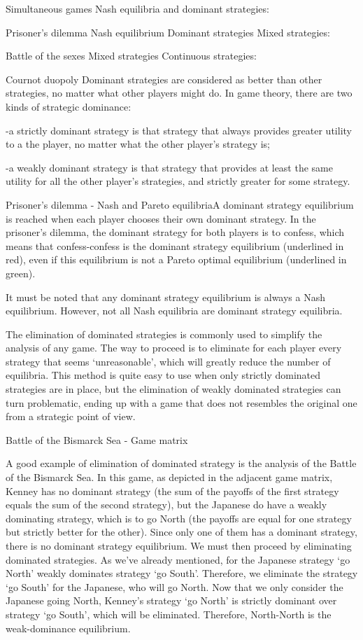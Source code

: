 Simultaneous games
Nash equilibria and dominant strategies:

Prisoner’s dilemma
Nash equilibrium
Dominant strategies
Mixed strategies:

Battle of the sexes
Mixed strategies
Continuous strategies:

Cournot duopoly
Dominant strategies are considered as better than other strategies, no matter what other players might do. In game theory, there are two kinds of strategic dominance:

-a strictly dominant strategy is that strategy that always provides greater utility to a the player, no matter what the other player’s strategy is;

-a weakly dominant strategy is that strategy that provides at least the same utility for all the other player’s strategies, and strictly greater for some strategy.

 

Prisoner's dilemma - Nash and Pareto equilibriaA dominant strategy equilibrium is reached when each player chooses their own dominant strategy. In the prisoner’s dilemma, the dominant strategy for both players is to confess, which means that confess-confess is the dominant strategy equilibrium (underlined in red), even if this equilibrium is not a Pareto optimal equilibrium (underlined in green).

It must be noted that any dominant strategy equilibrium is always a Nash equilibrium. However, not all Nash equilibria are dominant strategy equilibria.

 

The elimination of dominated strategies is commonly used to simplify the analysis of any game. The way to proceed is to eliminate for each player every strategy that seems ‘unreasonable’, which will greatly reduce the number of equilibria. This method is quite easy to use when only strictly dominated strategies are in place, but the elimination of weakly dominated strategies can turn problematic, ending up with a game that does not resembles the original one from a strategic point of view.

Battle of the Bismarck Sea - Game matrix

A good example of elimination of dominated strategy is the analysis of the Battle of the Bismarck Sea. In this game, as depicted in the adjacent game matrix, Kenney has no dominant strategy (the sum of the payoffs of the first strategy equals the sum of the second strategy), but the Japanese do have a weakly dominating strategy, which is to go North (the payoffs are equal for one strategy but strictly better for the other). Since only one of them has a dominant strategy, there is no dominant strategy equilibrium. We must then proceed by eliminating dominated strategies. As we’ve already mentioned, for the Japanese strategy ‘go North’ weakly dominates strategy ‘go South’. Therefore, we eliminate the strategy ‘go South’ for the Japanese, who will go North. Now that we only consider the Japanese going North, Kenney’s strategy ‘go North’ is strictly dominant over strategy ‘go South’, which will be eliminated. Therefore, North-North is the weak-dominance equilibrium.

